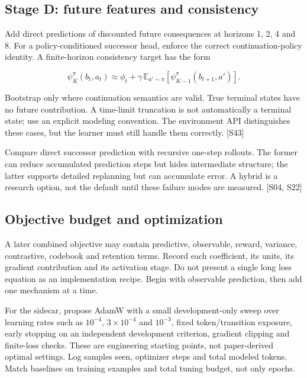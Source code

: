 \documentclass[
  11pt,
  a4paper,
]{article}
\begin{document}
\subsection{Stage D: future features and
consistency}\label{stage-d-future-features-and-consistency}

Add direct predictions of discounted future consequences at horizons 1,
2, 4 and 8. For a policy-conditioned successor head, enforce the correct
continuation-policy identity. A finite-horizon consistency target has
the form

\[
\psi_K^\pi(b_t,a_t)\approx\phi_t+\gamma\,\mathbb E_{a'\sim\pi}[\psi_{K-1}^\pi(b_{t+1},a')].
\]

Bootstrap only where continuation semantics are valid. True terminal
states have no future contribution. A time-limit truncation is not
automatically a terminal state; use an explicit modeling convention. The
environment API distinguishes these cases, but the learner must still
handle them correctly. {[}S43{]}

Compare direct successor prediction with recursive one-step rollouts.
The former can reduce accumulated prediction steps but hides
intermediate structure; the latter supports detailed replanning but can
accumulate error. A hybrid is a research option, not the default until
these failure modes are measured. {[}S04, S22{]}

\subsection{Objective budget and
optimization}\label{objective-budget-and-optimization}

A later combined objective may contain predictive, observable, reward,
variance, contrastive, codebook and retention terms. Record each
coefficient, its units, its gradient contribution and its activation
stage. Do not present a single long loss equation as an implementation
recipe. Begin with observable prediction, then add one mechanism at a
time.

For the sidecar, propose AdamW with a small development-only sweep over
learning rates such as \(10^{-4}\), \(3\times10^{-4}\) and \(10^{-3}\),
fixed token/transition exposure, early stopping on an independent
development criterion, gradient clipping and finite-loss checks. These
are engineering starting points, not paper-derived optimal settings. Log
samples seen, optimizer steps and total modeled tokens. Match baselines
on training examples and total tuning budget, not only epochs.
\end{document}
